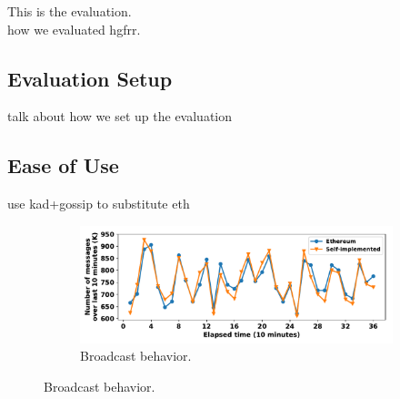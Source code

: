 This is the evaluation. \\

how we evaluated hgfrr.

\subsection{Evaluation Setup}

talk about how we set up the evaluation

\subsection{Ease of Use}

use kad+gossip to substitute eth

\begin{figure}[ht]
  \centering
    \begin{subfigure}[b]{0.48\textwidth}
	  \includegraphics[width=\textwidth]{figures/eth_ourgossip_num_msg_on_time.pdf}
	  \caption{Broadcast behavior.}
	  \label{eth_ourgossip_num_msg_on_time}
    \end{subfigure}


\end{figure}

